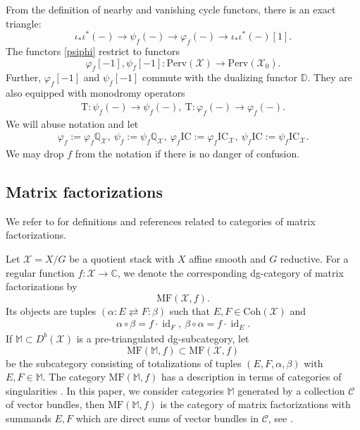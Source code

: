 \documentclass [11pt,oneside,a4paper,mathscr]{amsart}
\theoremstyle{definition}
\newcommand{\X}{\mathscr{X}}
\newcommand{\id}{\operatorname{id}}
\begin{document}
From the definition of nearby and vanishing cycle functors, 
there is an exact triangle:
\[\iota_*\iota^*(-)\to \psi_f(-)\to \varphi_f(-)\to \iota_*\iota^*(-)[1].\] 
The functors \eqref{psiphi} restrict to functors \[\varphi_f[-1], \psi_f[-1]\colon \mathrm{Perv}(\X)\to \mathrm{Perv}(\X_0).\] Further, $\varphi_f[-1]$ and $\psi_f[-1]$ commute with 
the dualizing functor $\mathbb{D}$.
They are also equipped with monodromy operators 
\begin{align*}
    \mathrm{T} \colon \psi_f(-) \to \psi_f(-), \ 
    \mathrm{T} \colon \varphi_f(-) \to \varphi_f(-). 
\end{align*}
We will abuse notation and let 
\begin{align*}\varphi_f:=\varphi_f\mathbb{Q}_\X, \ 
\psi_f:=\psi_f\mathbb{Q}_\X, \ \varphi_f\mathrm{IC}:=\varphi_f\mathrm{IC}_\X, \ \psi_f\mathrm{IC}:=\psi_f\mathrm{IC}_\X.
\end{align*}
We may drop $f$ from the notation if there is no danger of confusion. 




\subsection{Matrix factorizations}\label{subsection:matrixfactorizations}
 We refer to \cite[Subsection 2.6]{PTzero} for definitions and references related to categories of matrix factorizations. 
 
Let $\X=X/G$ be a quotient stack with $X$ affine smooth and $G$ reductive. For a regular function $f\colon\X\to\mathbb{C}$, we denote the corresponding dg-category of matrix factorizations by 
\[\mathrm{MF}(\X, f).\] 
Its objects are tuples $\left(\alpha\colon E\rightleftarrows F\colon\beta\right)$ such that $E, F\in \mathrm{Coh}(\X)$ and
\begin{align*}
\alpha \circ \beta=f \cdot \id_F, \ \beta \circ \alpha=f \cdot \id_E.
\end{align*}
If $\mathbb{M}\subset D^b(\X)$ is a pre-triangulated dg-subcategory, let 
\[\mathrm{MF}(\mathbb{M}, f)\subset \mathrm{MF}(\X, f)\]
be the subcategory consisting of totalizations of tuples $(E, F, \alpha, \beta)$ with $E, F \in \mathbb{M}$. The category $\mathrm{MF}(\mathbb{M}, f)$ has a description in terms of categories of singularities \cite[Subsection 2.6]{PTzero}. In this paper, we consider categories $\mathbb{M}$ generated by a collection $\mathscr{C}$ of vector bundles, then 
$\mathrm{MF}(\mathbb{M}, f)$ is the category of matrix factorizations with summands $E, F$ which are direct sums of vector bundles in $\mathscr{C}$, see \cite[Lemma 2.3]{PTzero}.
\end{document}
